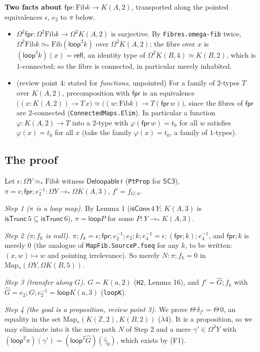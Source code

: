 \documentclass[11pt]{amsart}
\theoremstyle{definition}
\theoremstyle{remark}
\newcommand{\Om}{\Omega}
\newcommand{\code}[1]{\texttt{#1}}
\newcommand{\cT}{\mathsf{isTrunc}}
\newcommand{\cC}{\mathsf{isConn}}
\newcommand{\refl}{\mathsf{refl}}
\newcommand{\Fib}{\mathrm{Fib}}
\newcommand{\fpr}{\mathsf{fpr}}
\newcommand{\SCt}{\mathsf{SC3}}
\newcommand{\Del}{\mathsf{Deloopable}}
\newcommand{\pteq}{\simeq_*}
\newcommand{\Map}{\mathrm{Map}_*}
\newcommand{\lp}{\mathsf{loop}}
\newcommand{\Z}{\mathbb{Z}}
\begin{document}
\noindent\textbf{Two facts about $\fpr:\Fib k\to K(A,2)$}, transported along the
pointed equivalences $\epsilon$, $e_2$ to $\pi$ below.
\begin{itemize}
\item[(F1)] $\Om^2\fpr:\Om^2\Fib k\to\Om^2K(A,2)$ is surjective. By
\code{Fibres.omega-fib} twice, $\Om^2\Fib k\pteq\Fib(\lp^2k)$ over
$\Om^2K(A,2)$; the fibre over $x$ is $(\lp^2k)(x)=\refl$, an identity type of
$\Om^2K(B,4)\simeq K(B,2)$, which is $1$-connected; so the fibre is connected,
in particular merely inhabited.
\item[(F2)] (review point 4: stated for \emph{functions}, unpointed) For a family
of $2$-types $T$ over $K(A,2)$, precomposition with $\fpr$ is an equivalence
$\big((x:K(A,2))\to T\,x\big)\simeq\big((w:\Fib k)\to T(\fpr\,w)\big)$, since the
fibres of $\fpr$ are $2$-connected (\code{ConnectedMaps.Elim}). In particular a
function $\varphi:K(A,2)\to T$ into a $2$-type with $\varphi(\fpr\,w)=t_0$ for
all $w$ satisfies $\varphi(x)=t_0$ for all $x$ (take the family $\varphi(x)=t_0$,
a family of $1$-types).
\end{itemize}

\subsection{The proof}
Let $\epsilon:\Om Y\pteq\Fib k$ witness $\Del\,t$ (\code{PtProp} for $\SCt$),
$\pi=\epsilon;\fpr;e_2^{-1}:\Om Y\to_*\Om K(A,3)$, $f'=f_{G;k}$.

\emph{Step 1 ($\pi$ is a loop map).} By Lemma 1 ($\cC\,4\,Y$; $K(A,3)$ is
$\cT\,5\subseteq\cT\,6$), $\pi=\lp P$ for some $P:Y\to_*K(A,3)$.

\emph{Step 2 ($\pi;f_k$ is null).} $\pi;f_k=\epsilon;\fpr;e_2^{-1};e_2;k;e_4^{-1}
=\epsilon;(\fpr;k);e_4^{-1}$, and $\fpr;k$ is merely $0$
(the analogue of \code{MapFib.SourceP.fseq} for any $k$, to be written:
$(x,w)\mapsto w$ and pointing irrelevance). So merely $N:\pi;f_k=0$ in
$\Map(\Om Y,\Om K(B,5))$.

\emph{Step 3 (transfer along $G$).} $G=K(a,2)$ (\code{H2}, Lemma 16), and
$f'=\hat G;f_k$ with $\hat G=e_2;G;e_2^{-1}=\lp K(a,3)$ (\code{loopK}).

\emph{Step 4 (the goal is a proposition, review point 3).} We prove
$\Theta\,\delta_{f'}=\Theta\,0$, an equality in the set
$\Map(K(\Z,2),K(B,2))$ ($\lambda$4). It is a proposition, so we may eliminate into
it the mere path $N$ of Step 2 and a mere $\gamma'\in\Om^3Y$ with
$(\lp^2\pi)(\gamma')=(\lp^2\hat G)(\hat\gamma_0)$, which exists by (F1).
\end{document}

